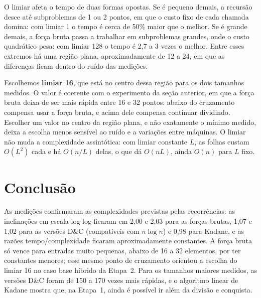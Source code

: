 \documentclass[11pt,a4paper]{article}
\begin{document}
O limiar afeta o tempo de duas formas opostas. Se é pequeno demais, a recursão
desce até subproblemas de 1 ou 2 pontos, em que o custo fixo de cada chamada
domina: com limiar 1 o tempo é cerca de 50\% maior que o melhor. Se é grande
demais, a força bruta passa a trabalhar em subproblemas grandes, onde o custo
quadrático pesa: com limiar 128 o tempo é 2{,}7 a 3 vezes o melhor. Entre esses
extremos há uma região plana, aproximadamente de 12 a 24, em que as diferenças
ficam dentro do ruído das medições.

Escolhemos \textbf{limiar 16}, que está no centro dessa região para os dois
tamanhos medidos. O valor é coerente com o experimento da seção anterior, em
que a força bruta deixa de ser mais rápida entre 16 e 32 pontos: abaixo do
cruzamento compensa usar a força bruta, e acima dele compensa continuar
dividindo. Escolher um valor no centro da região plana, e não exatamente o
mínimo medido, deixa a escolha menos sensível ao ruído e a variações entre
máquinas. O limiar não muda a complexidade assintótica: com limiar constante
$L$, as folhas custam $O(L^2)$ cada e há $O(n/L)$ delas, o que dá $O(nL)$, ainda
$O(n)$ para $L$ fixo.

\section{Conclusão}

As medições confirmaram as complexidades previstas pelas recorrências: as
inclinações em escala log-log ficaram em 2{,}00 e 2{,}03 para as forças brutas,
1{,}07 e 1{,}02 para as versões D\&C (compatíveis com $n\log n$) e 0{,}98 para
Kadane, e as razões tempo/complexidade ficaram aproximadamente constantes. A
força bruta só vence para entradas muito pequenas, abaixo de 16 a 32 elementos,
por ter constantes menores; esse mesmo ponto de cruzamento orientou a escolha
do limiar 16 no caso base híbrido da Etapa~2. Para os tamanhos maiores medidos,
as versões D\&C foram de 150 a 170 vezes mais rápidas, e o algoritmo linear de
Kadane mostra que, na Etapa~1, ainda é possível ir além da divisão e conquista.
\end{document}
